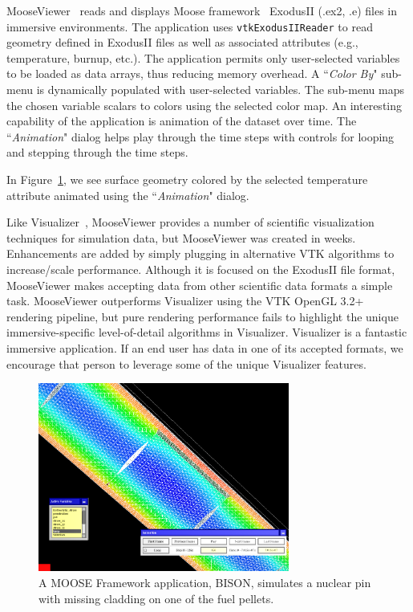MooseViewer~\cite{MooseViewer} reads and displays Moose framework~\cite{Gaston:2015, MooseFramework} ExodusII (.ex2, .e) files in immersive environments. The application uses \texttt{vtkExodusIIReader} to read geometry defined in ExodusII files as well as associated attributes (e.g., temperature, burnup, etc.). The application permits only user-selected variables to be loaded as data arrays, thus reducing memory overhead. A ``\textit{Color By}" sub-menu is dynamically populated with user-selected variables. The sub-menu maps the chosen variable scalars to colors using the selected color map.
An interesting capability of the application is animation of the dataset over time.
The ``\textit{Animation}" dialog helps play through the time steps with controls for looping and stepping through the time steps.

In Figure~\ref{fig:fuelpin}, we see surface geometry colored by the selected temperature attribute animated using the ``\textit{Animation}" dialog.

Like Visualizer~\cite{Billen:2008}, MooseViewer provides a number of scientific visualization techniques for simulation data, but MooseViewer was created in weeks. Enhancements are added by simply plugging in alternative VTK algorithms to increase/scale performance.  Although it is focused on the ExodusII file format, MooseViewer makes accepting data from other scientific data formats a simple task. MooseViewer outperforms Visualizer using the VTK OpenGL 3.2+ rendering pipeline, but pure rendering performance fails to highlight the unique immersive-specific level-of-detail algorithms in Visualizer. Visualizer is a fantastic immersive application. If an end user has data in one of its accepted formats, we encourage that person to leverage some of the unique Visualizer features.

\begin{figure}[h!]
 \centering
 \includegraphics[width=3.25in]{images/fuelpin.png}
 \caption{A MOOSE Framework application, BISON, simulates a nuclear pin with missing cladding on one of the fuel pellets.}
 \label{fig:fuelpin}
\end{figure}


